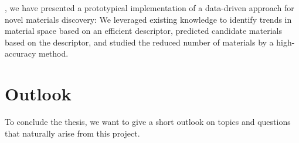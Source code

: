 , we have presented a prototypical implementation of a data-driven approach for novel materials discovery: We leveraged existing knowledge to identify trends in material space based on an efficient descriptor, predicted candidate materials based on the descriptor, and studied the reduced number of materials by a high-accuracy method.


\section{Outlook}
To conclude the thesis, we want to give a short outlook on topics and questions that naturally arise from this project.


